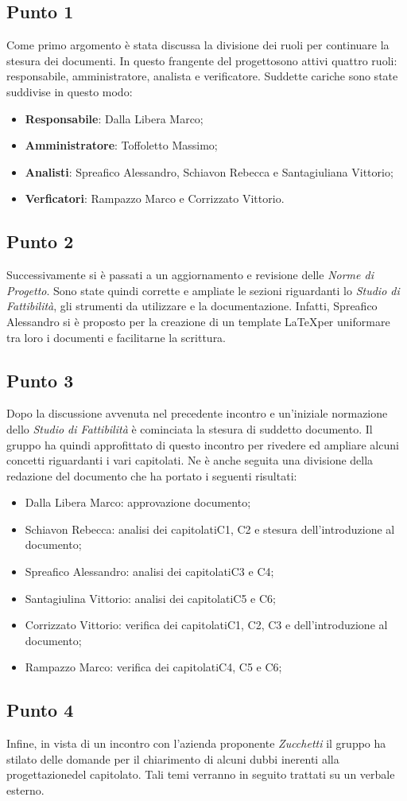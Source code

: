     \subsection{Punto 1}
        Come primo argomento è stata discussa la divisione dei ruoli per continuare la stesura dei documenti. In questo frangente del progetto\glosp sono attivi quattro ruoli: responsabile, amministratore, analista e verificatore. Suddette cariche sono state suddivise in questo modo:
        \begin{itemize}
            \item \textbf{Responsabile}: Dalla Libera Marco;
            \item \textbf{Amministratore}: Toffoletto Massimo;
            \item \textbf{Analisti}: Spreafico Alessandro, Schiavon Rebecca e Santagiuliana Vittorio;
            \item \textbf{Verficatori}: Rampazzo Marco e Corrizzato Vittorio. 
        \end{itemize}
    \subsection{Punto 2}
        Successivamente si è passati a un aggiornamento e revisione delle \textit{Norme di Progetto}. Sono state quindi corrette e ampliate le sezioni riguardanti lo \textit{Studio di Fattibilità}, gli strumenti da utilizzare e la documentazione. Infatti, Spreafico Alessandro si è proposto per la creazione di un template \LaTeX per uniformare tra loro i documenti e facilitarne la scrittura.
    \subsection{Punto 3}
        Dopo la discussione avvenuta nel precedente incontro e un'iniziale normazione dello \textit{Studio di Fattibilità} è cominciata la stesura di suddetto documento. Il gruppo ha quindi approfittato di questo incontro per rivedere ed ampliare alcuni concetti riguardanti i vari capitolati\glo. Ne è anche seguita una divisione della redazione del documento che ha portato i seguenti risultati:
        \begin{itemize}
            \item Dalla Libera Marco: approvazione documento;
            \item Schiavon Rebecca: analisi dei capitolati\glosp C1, C2 e stesura dell'introduzione al documento;
            \item Spreafico Alessandro: analisi dei capitolati\glosp C3 e C4;
            \item Santagiulina Vittorio: analisi dei capitolati\glosp C5 e C6;
            \item Corrizzato Vittorio: verifica dei capitolati\glosp C1, C2, C3 e dell'introduzione al documento;
            \item Rampazzo Marco: verifica dei capitolati\glosp C4, C5 e C6;
        \end{itemize}
    \subsection{Punto 4}
        Infine, in vista di un incontro con l'azienda proponente \textit{Zucchetti} il gruppo ha stilato delle domande per il chiarimento di alcuni dubbi inerenti alla progettazione\glosp del capitolato\glo. Tali temi verranno in seguito trattati su un verbale esterno.